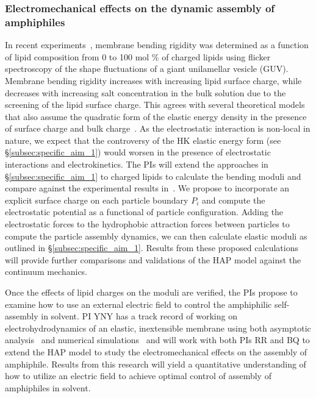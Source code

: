\subsubsection{Electromechanical effects on the dynamic assembly of amphiphiles \label{subsubsec:em_effects}}
In recent experiments~\cite{FaizEtAl2019_SoftMatt}, membrane bending rigidity
was determined as a function of lipid composition from 0 to 100 mol $\%$ of
charged lipids using flicker spectroscopy of the shape fluctuations of a giant
unilamellar vesicle (GUV).
Membrane bending rigidity increases with increasing lipid surface charge,
while decreases with increasing salt concentration in the bulk solution
due to the screening of the lipid surface charge. This
agrees with several theoretical models~\cite{Kralchevsky1996_JCIS,
May1996_JChemPhys, LoubetEtAl2013_PRE} that also assume the quadratic
form of the elastic energy density in the presence of surface charge and
bulk charge~\cite{DuplantierGoldstein1990_PRL, Winterhalter1992_JPC}. As
the electrostatic interaction is non-local in nature, we expect that the
controversy of the HK elastic energy form (see
\S\ref{subsec:specific_aim_1}) would worsen in the presence of
electrostatic interactions and electrokinetics. The PIs will extend
the approaches in \S\ref{subsec:specific_aim_1} to charged lipids to
calculate the bending moduli and compare against the experimental
results in~\cite{FaizEtAl2019_SoftMatt}. We propose to incorporate an
explicit surface charge on each particle boundary $P_i$ and compute the
electrostatic potential as a functional of particle configuration.
Adding the electrostatic forces to the hydrophobic attraction forces
between particles to compute the particle assembly dynamics, we can then
calculate elastic moduli as outlined in \S\ref{subsec:specific_aim_1}.
Results from these proposed calculations will provide further comparisons and
validations of the HAP model against the continuum mechanics.

Once the effects of lipid charges on the moduli are verified, the PIs
propose to examine how to use an external electric field to control the
amphiphilic self-assembly in solvent. PI YNY has a track record of
working on electrohydrodynamics of an elastic, inextensible membrane
using both asymptotic analysis~\cite{Nganguia2013_PRE, Young2014_JFM,
Young2015_PoF} and numerical simulations~\cite{Nganguia2015_CiCP} and
will work with both PIs RR and BQ to extend the HAP model to study the
electromechanical effects on the assembly of amphiphile. Results from
this research will yield a quantitative understanding of how to utilize
an electric field to achieve optimal control of assembly of amphiphiles
in solvent.




